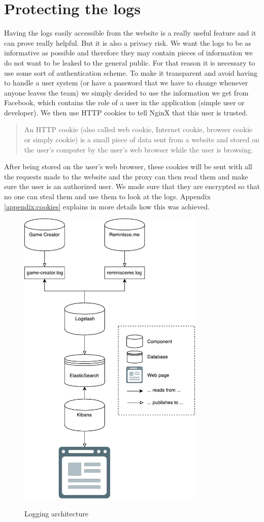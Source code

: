 \section{Protecting the logs}
Having the logs easily accessible from the website is a really useful feature and it can prove really helpful. But it is also a privacy risk. We want the logs to be as informative as possible and therefore they may contain pieces of information we do not want to be leaked to the general public. For that reason it is necessary to use some sort of authentication scheme. To make it transparent and avoid having to handle a user system (or have a password that we have to change whenever anyone leaves the team) we simply decided to use the information we get from Facebook, which contains the role of a user in the application (simple user or developer). We then use HTTP cookies to tell NginX that this user is trusted. \blockquote{An HTTP cookie (also called web cookie, Internet cookie, browser cookie or simply cookie) is a small piece of data sent from a website and stored on the user's computer by the user's web browser while the user is browsing.}\cite{cookie} After being stored on the user's web browser, these cookies will be sent with all the requests made to the website and the proxy can then read them and make sure the user is an authorized user. We made sure that they are encrypted so that no one can steal them and use them to look at the logs. Appendix \ref{appendix:cookies} explains in more details how this was achieved.
\begin{figure}
\centering
{\includegraphics[width=3.5in]{images/logging_arch.pdf}}
\caption{Logging architecture}
\label{fig:loggingArch}
\end{figure}

